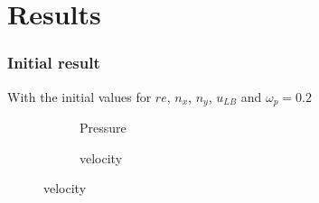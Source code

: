 \documentclass{beamer}
\begin{document}
\section*{Results}

\begin{frame}[fragile]
\frametitle{Initial result}
With the initial values for $re$, $n_{x}$, $n_{y}$, $u_{LB}$ and $\omega_{p}=0.2$
\begin{figure}
\begin{subfigure}{0.48\textwidth}
\caption{Pressure}
\end{subfigure}
\begin{subfigure}{0.48\textwidth}
\caption{velocity}
\end{subfigure}
\end{figure}
\end{frame}
\end{document}
